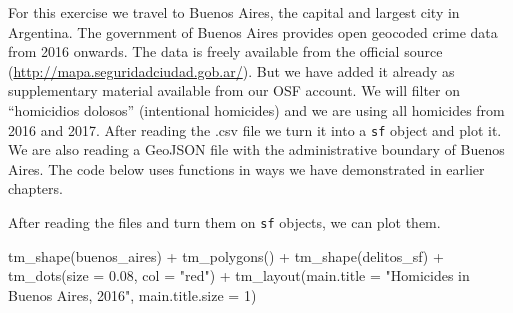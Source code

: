 \documentclass[
  krantz2]{krantz}
\makeatletter
\newenvironment{Shaded}{\begin{snugshade}}{\end{snugshade}}
\newcommand{\AttributeTok}[1]{\textcolor[rgb]{0.61,0.61,0.61}{#1}}
\newcommand{\ConstantTok}[1]{\textcolor[rgb]{0,0,0}{#1}}
\newcommand{\DecValTok}[1]{\textcolor[rgb]{0.06,0.06,0.06}{#1}}
\newcommand{\FloatTok}[1]{\textcolor[rgb]{0.06,0.06,0.06}{#1}}
\newcommand{\FunctionTok}[1]{\textcolor[rgb]{0,0,0}{#1}}
\newcommand{\NormalTok}[1]{#1}
\newcommand{\OtherTok}[1]{\textcolor[rgb]{0.37,0.37,0.37}{#1}}
\newcommand{\SpecialCharTok}[1]{\textcolor[rgb]{0,0,0}{#1}}
\newcommand{\StringTok}[1]{\textcolor[rgb]{0.5,0.5,0.5}{#1}}
\newenvironment{kframe}{%
\medskip{}
\setlength{\fboxsep}{.8em}
 \def\at@end@of@kframe{}%
 \ifinner\ifhmode%
  \def\at@end@of@kframe{\end{minipage}}%
  \begin{minipage}{\columnwidth}%
 \fi\fi%
 \def\FrameCommand##1{\hskip\@totalleftmargin \hskip-\fboxsep
 \colorbox{shadecolor}{##1}\hskip-\fboxsep
     \hskip-\linewidth \hskip-\@totalleftmargin \hskip\columnwidth}%
 \MakeFramed {\advance\hsize-\width
   \@totalleftmargin\z@ \linewidth\hsize
   \@setminipage}}%
 {\par\unskip\endMakeFramed%
 \at@end@of@kframe}
\renewenvironment{Shaded}{\begin{kframe}}{\end{kframe}}
\makeatother
\begin{document}
For this exercise we travel to Buenos Aires, the capital and largest city in Argentina. The government of Buenos Aires provides open geocoded crime data from 2016 onwards. The data is freely available from the official source (\url{http://mapa.seguridadciudad.gob.ar/}). But we have added it already as supplementary material available from our OSF account. We will filter on ``homicidios dolosos'' (intentional homicides) and we are using all homicides from 2016 and 2017. After reading the .csv file we turn it into a \texttt{sf} object and plot it. We are also reading a GeoJSON file with the administrative boundary of Buenos Aires. The code below uses functions in ways we have demonstrated in earlier chapters.

\begin{Shaded}
\end{Shaded}

After reading the files and turn them on \texttt{sf} objects, we can plot them.

\begin{Shaded}
\begin{Highlighting}[]
\FunctionTok{tm\_shape}\NormalTok{(buenos\_aires) }\SpecialCharTok{+} 
  \FunctionTok{tm\_polygons}\NormalTok{() }\SpecialCharTok{+}
  \FunctionTok{tm\_shape}\NormalTok{(delitos\_sf) }\SpecialCharTok{+}
  \FunctionTok{tm\_dots}\NormalTok{(}\AttributeTok{size =} \FloatTok{0.08}\NormalTok{, }\AttributeTok{col =} \StringTok{"red"}\NormalTok{) }\SpecialCharTok{+}
  \FunctionTok{tm\_layout}\NormalTok{(}\AttributeTok{main.title =} \StringTok{"Homicides in Buenos Aires, 2016"}\NormalTok{,}
            \AttributeTok{main.title.size =} \DecValTok{1}\NormalTok{)}
\end{Highlighting}
\end{Shaded}
\end{document}
